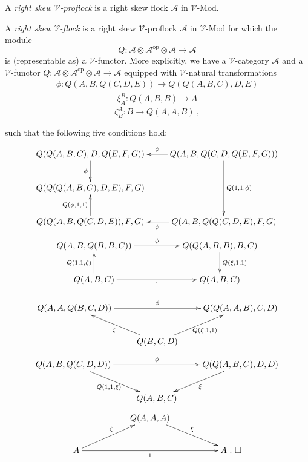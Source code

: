 \documentclass{beamer}
\def\CA{{\mathscr A}}
\def\CV{{\mathscr V}}
\begin{document}
 \begin{frame}
 \begin{Definition} A {\em right skew $\CV$-proflock} is a right skew flock $\CA$ in $\CV\text{-}\mathrm{Mod}$.
\end{Definition}
 
A {\em right skew} $\CV$-{\em flock} is a right skew $\CV$-proflock $\CA$ in $\CV\text{-}\mathrm{Mod}$ for which the module\ \
\begin{equation}
Q:\CA\otimes \CA^{\mathrm{op}}\otimes \CA\longrightarrow
\CA
\end{equation}
is (representable as) a $\CV$-functor. 
More explicitly, we have a $\CV$-category $\CA$ and a
$\CV$-functor $Q:\CA\otimes \CA^{\mathrm{op}}\otimes
\CA\longrightarrow \CA$ equipped with $\CV$-natural
transformations
\begin{gather*}
\phi :Q( A,B,Q(C,D,E)) \longrightarrow Q(Q(A,B,C),D,E)
\end{gather*}
\begin{gather*}
\xi _{A}^{B}:Q( A,B,B) \longrightarrow A
\end{gather*}
\begin{equation*}
\zeta _{B}^{A}:B\longrightarrow Q( A,A,B) \ ,
\end{equation*}
\end{frame}
\begin{frame}
such that the following five conditions hold:
\begin{gather*}
\begin{split}
\xymatrix{
Q(Q(A,B,C),D,Q(E,F,G)) \ar[d]_{\phi}="1" & Q(A,B,Q(C,D,Q(E,F,G))) \ar[l]_{\phi} \ar[dd]^{Q(1,1,\phi)}\\
Q(Q(Q(A,B,C),D,E),F,G)  &  \\
Q(Q(A,B,Q(C,D,E)),F,G)\ar[u]^{Q(\phi,1,1)}  & Q(A,B,Q(Q(C,D,E),F,G) \ar[l]^{\phi}
} 
\end{split}\\ 
\begin{split}
\xymatrix{
Q(A,B,Q(B,B,C)) \ar[rr]^-{\phi} && Q(Q(A,B,B),B,C) \ar[d]^{Q(\xi,1,1)}="2" \\
Q(A,B,C) \ar[u]^{Q(1,1,\zeta)}="1" \ar[rr]_{1} && Q(A,B,C)
} 
\end{split}
\end{gather*}
\end{frame}
\begin{frame}
\begin{equation*}
\xymatrix{
Q(A,A,Q(B,C,D)) \ar[rr]^{\phi}   && Q(Q(A,A,B),C,D)  \\
& Q(B,C,D) \ar[lu]^{\zeta} \ar[ru]_{Q(\zeta,1,1)}  &
}
\end{equation*}
\begin{equation*}
\xymatrix{
Q(A,B,Q(C,D,D)) \ar[rd]_{Q(1,1,\xi)}\ar[rr]^{\phi}   && Q(Q(A,B,C),D,D) \ar[ld]^{\xi} \\
& Q(A,B,C)  &
}
\end{equation*}
\begin{gather*}
\begin{split}
\xymatrix{
&& Q(A,A,A)\ar[rrd]^{\xi} && \\
A \ar[rru]^{\zeta} \ar[rrrr]_-{1} &&  &&  A \ . \ \square 
} 
\end{split}
\end{gather*}
 \end{frame}
\end{document}
